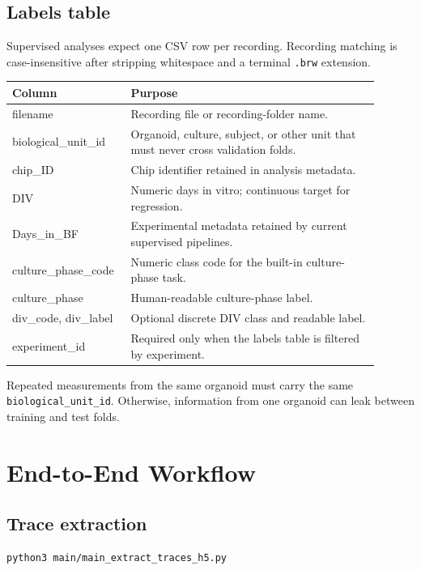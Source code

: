 \documentclass[11pt,a4paper]{article}
\newcommand{\code}[1]{\texttt{#1}}
\begin{document}
\subsection{Labels table}

Supervised analyses expect one CSV row per recording. Recording matching is
case-insensitive after stripping whitespace and a terminal \code{.brw}
extension.

\begin{longtable}{>{\ttfamily}p{0.26\linewidth}p{0.64\linewidth}}
\toprule
Column & Purpose \\
\midrule
filename & Recording file or recording-folder name. \\
biological\_unit\_id & Organoid, culture, subject, or other unit that must never cross validation folds. \\
chip\_ID & Chip identifier retained in analysis metadata. \\
DIV & Numeric days in vitro; continuous target for regression. \\
Days\_in\_BF & Experimental metadata retained by current supervised pipelines. \\
culture\_phase\_code & Numeric class code for the built-in culture-phase task. \\
culture\_phase & Human-readable culture-phase label. \\
div\_code, div\_label & Optional discrete DIV class and readable label. \\
experiment\_id & Required only when the labels table is filtered by experiment. \\
\bottomrule
\end{longtable}

Repeated measurements from the same organoid must carry the same
\code{biological\_unit\_id}. Otherwise, information from one organoid can leak
between training and test folds.

\section{End-to-End Workflow}

\subsection{Trace extraction}

\begin{lstlisting}
python3 main/main_extract_traces_h5.py
\end{lstlisting}
\end{document}

